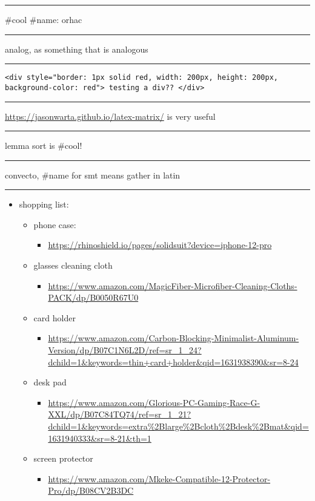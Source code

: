 \documentclass[letterpaper]{article}
\begin{document}
\noindent\rule{\textwidth}{0.5pt}

\#cool \#name: orhac

\noindent\rule{\textwidth}{0.5pt}

analog, as something that is analogous

\noindent\rule{\textwidth}{0.5pt}

\begin{verbatim}
<div style="border: 1px solid red, width: 200px, height: 200px, background-color: red"> testing a div?? </div>
\end{verbatim}

\noindent\rule{\textwidth}{0.5pt}

\url{https://jasonwarta.github.io/latex-matrix/} is very useful

\noindent\rule{\textwidth}{0.5pt}

lemma sort is \#cool!

\noindent\rule{\textwidth}{0.5pt}

convecto, \#name for smt means gather in latin

\noindent\rule{\textwidth}{0.5pt}

\begin{itemize}
\item shopping list:
\begin{itemize}
\item phone case:
\begin{itemize}
\item \url{https://rhinoshield.io/pages/solidsuit?device=iphone-12-pro}
\end{itemize}
\item glasses cleaning cloth
\begin{itemize}
\item \url{https://www.amazon.com/MagicFiber-Microfiber-Cleaning-Cloths-PACK/dp/B0050R67U0}
\end{itemize}
\item card holder
\begin{itemize}
\item \url{https://www.amazon.com/Carbon-Blocking-Minimalist-Aluminum-Version/dp/B07C1N6L2D/ref=sr\_1\_24?dchild=1\&keywords=thin+card+holder\&qid=1631938390\&sr=8-24}
\end{itemize}
\item desk pad
\begin{itemize}
\item \url{https://www.amazon.com/Glorious-PC-Gaming-Race-G-XXL/dp/B07C84TQ74/ref=sr\_1\_21?dchild=1\&keywords=extra\%2Blarge\%2Bcloth\%2Bdesk\%2Bmat\&qid=1631940333\&sr=8-21\&th=1}
\end{itemize}
\item screen protector
\begin{itemize}
\item \url{https://www.amazon.com/Mkeke-Compatible-12-Protector-Pro/dp/B08CV2B3DC}
\end{itemize}
\end{itemize}
\end{itemize}
\end{document}
